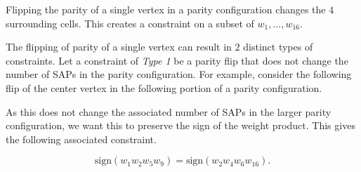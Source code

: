 \documentclass[12pt]{article}
\theoremstyle{plain}
\theoremstyle{definition}
\theoremstyle{remark}
\theoremstyle{definition}
\newcommand{\cell}[4]{ \draw[thick] ( #1 , #2 ) rectangle ( #3 , #4 );}
\newcommand{\lablnode}[3]{\node[shape=circle,draw=none,fill=none, inner sep=0pt,minimum size=0pt] (A) at ( #1 , #2 ) {#3};}
\begin{document}
Flipping the parity of a single vertex in a parity configuration changes the $4$ surrounding cells. This creates a constraint on a subset of $w_1 ,\dots, w_{16}.$ 

The flipping of parity of a single vertex can result in $2$ distinct types of constraints. Let a constraint of \textit{Type 1} be a parity flip that does not change the number of SAPs in the parity configuration. For example, consider the following flip of the center vertex in the following portion of a parity configuration.

\begin{center}
\end{center}

As this does not change the associated number of SAPs in the larger parity configuration, we want this to preserve the sign of the weight product. This gives the following associated constraint. 

$$\text{sign}(w_{1}w_{2}w_{5}w_{9}) = \text{sign}(w_{2}w_{4}w_{6}w_{16}).$$
\end{document}
